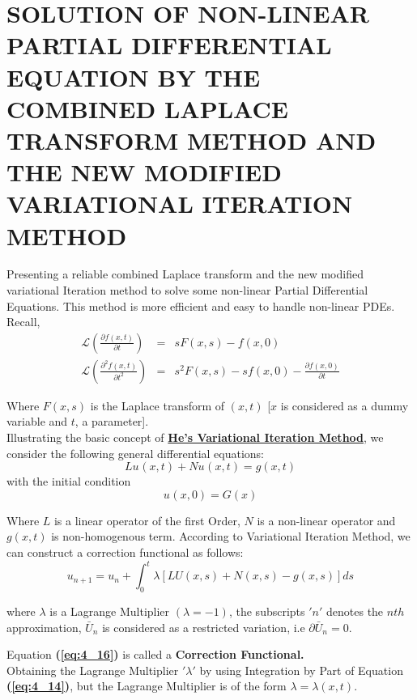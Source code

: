 \documentclass[12pt]{report}
\newcommand{\Laplace}{\mathcal{L}}
\newcommand{\Un}[2]{u_{#1}(#2)}
\newcommand{\NI}{\noindent}
\newcommand{\LTb}[1]{\Laplace \left(#1\right)}
\newcommand{\bt}[1]{\textbf{#1}}
\newcommand{\refn}[1]{\bt{(\ref{#1})}}
\begin{document}
\section{SOLUTION OF NON-LINEAR PARTIAL DIFFERENTIAL EQUATION BY THE COMBINED LAPLACE TRANSFORM METHOD AND THE NEW MODIFIED VARIATIONAL ITERATION METHOD}
\NI Presenting a reliable combined Laplace transform and the new modified variational Iteration method to solve some non-linear Partial Differential Equations. This method is more efficient and easy to handle non-linear PDEs.\\

\NI Recall, \\[0.2cm]
\begin{eqnarray}
	\LTb{\frac{\partial f(x,t)}{\partial t}} &=& sF(x,s) - f(x,0)\\
	\LTb{\frac{\partial^2 f(x,t)}{\partial t^2}} &=& s^2 F(x,s) - sf(x,0) - \frac{\partial f(x,0)}{\partial t}
\end{eqnarray}

\NI Where $F(x,s)$ is the Laplace transform of $(x,t)$ [$x$ is considered as a dummy variable and $t$, a parameter].\\[0.2cm]

\NI Illustrating the basic concept of \underline{\textbf{He's Variational Iteration Method}}, we consider the following general differential equations:\\
\begin{equation}
	L\Un{}{x,t} + N\Un{}{x,t} = g(x,t) \label{eq:4_14}
\end{equation}
with the initial condition 
\begin{equation}
	\Un{}{x,0} = G(x) \label{eq:4_15} 
\end{equation}

\NI Where $L$ is a linear operator of the first Order, $N$ is a non-linear operator and $g(x,t)$ is non-homogenous term. According to Variational  Iteration Method, we can construct a correction functional as follows: 
\begin{equation}
	u_{n+1} = u_n + \int_{0}^{t} \lambda \left[ LU(x,s) + N(x,s) - g(x,s) \right] ds \label{eq:4_16}
\end{equation}

\NI where $\lambda$ is a Lagrange Multiplier $(\lambda = -1)$, the subscripts $'n'$ denotes the $nth$ approximation, $\bar{U}_n$ is considered as a restricted variation, i.e $\partial\bar{U}_n = 0$.

\NI Equation \refn{eq:4_16} is called a \textbf{Correction Functional.}\\
Obtaining the Lagrange Multiplier $'\lambda'$ by using Integration by Part of Equation \refn{eq:4_14}, but the Lagrange Multiplier is of the form $\lambda = \lambda(x,t)$.
\end{document}
